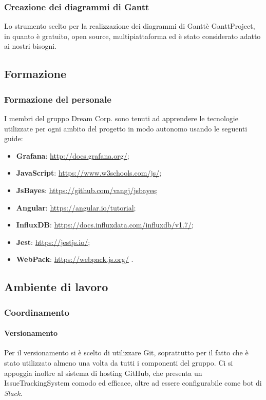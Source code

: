                 \subsubsection{Creazione dei diagrammi di Gantt}
                    Lo strumento scelto per la realizzazione dei diagrammi di Gantt\pedice è GanttProject,
                    in quanto è gratuito, open source, multipiattaforma ed è stato considerato adatto
                    ai nostri bisogni.
                \subsection{Formazione}            
                    \subsubsection{Formazione del personale}
                        I membri del gruppo Dream Corp. sono tenuti ad apprendere le tecnologie utilizzate per ogni ambito del progetto in modo autonomo usando le seguenti guide:
                    \begin{itemize}
                        \item \textbf{Grafana}: \url{http://docs.grafana.org/};
                        \item \textbf{JavaScript}: \url{https://www.w3schools.com/js/};
                        \item \textbf{JsBayes}: \url{https://github.com/vangj/jsbayes};
                        \item \textbf{Angular}: \url{https://angular.io/tutorial};
                        \item \textbf{InfluxDB}: \url{https://docs.influxdata.com/influxdb/v1.7/};
                        \item \textbf{Jest}: \url{https://jestjs.io/};
                        \item \textbf{WebPack}: \url{https://webpack.js.org/} .
                    \end{itemize}
                \subsection{Ambiente di lavoro}
                    \subsubsection{Coordinamento}
                        \paragraph{Versionamento} 
                            Per il versionamento si è scelto di utilizzare Git, soprattutto per il fatto che è stato utilizzato almeno una volta da tutti i componenti del gruppo. Ci si appoggia inoltre al sistema di hosting GitHub, che presenta un IssueTrackingSystem comodo ed efficace, oltre ad essere configurabile come bot di \textit{Slack}.
